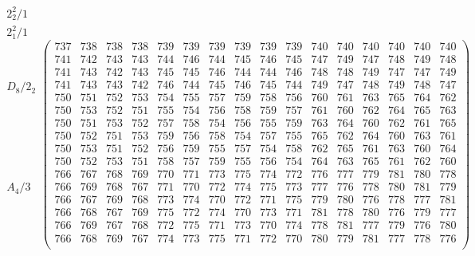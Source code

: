 \documentclass[11pt,a4paper]{amsart}
\begin{document}
\begin{align*}
\begin{array}{c}%
2^2_2/1 \\ \hline
2^2_1/1 \\
\phantom{2^2_1/1} \\
\phantom{2^2_1/1} \\ \hline
D_8/2_2 \\
\phantom{D_8/2_2} \\
\phantom{D_8/2_2} \\
\phantom{D_8/2_2} \\
\phantom{D_8/2_2} \\
\phantom{D_8/2_2} \\ \hline
A_4/3 \\
\phantom{A_4/3} \\
\phantom{A_4/3} \\
\phantom{A_4/3} \\
\phantom{A_4/3} \\
\phantom{A_4/3} \\
\end{array}
\left(\begin{array}{r|rrr|rrrrrr|rrrrrr}%
737&738&738&738&739&739&739&739&739&739&740&740&740&740&740&740\\%
\hline
741&742&743&743&744&746&744&745&746&745&747&749&747&748&749&748\\%
741&743&742&743&745&745&746&744&744&746&748&748&749&747&747&749\\%
741&743&743&742&746&744&745&746&745&744&749&747&748&749&748&747\\%
\hline
750&751&752&753&754&755&757&759&758&756&760&761&763&765&764&762\\%
750&753&752&751&755&754&756&758&759&757&761&760&762&764&765&763\\%
750&751&753&752&757&758&754&756&755&759&763&764&760&762&761&765\\%
750&752&751&753&759&756&758&754&757&755&765&762&764&760&763&761\\%
750&753&751&752&756&759&755&757&754&758&762&765&761&763&760&764\\%
750&752&753&751&758&757&759&755&756&754&764&763&765&761&762&760\\%
\hline
766&767&768&769&770&771&773&775&774&772&776&777&779&781&780&778\\%
766&769&768&767&771&770&772&774&775&773&777&776&778&780&781&779\\%
766&767&769&768&773&774&770&772&771&775&779&780&776&778&777&781\\%
766&768&767&769&775&772&774&770&773&771&781&778&780&776&779&777\\%
766&769&767&768&772&775&771&773&770&774&778&781&777&779&776&780\\%
766&768&769&767&774&773&775&771&772&770&780&779&781&777&778&776\\%
\end{array}\right)%
\end{align*}
\end{document}
